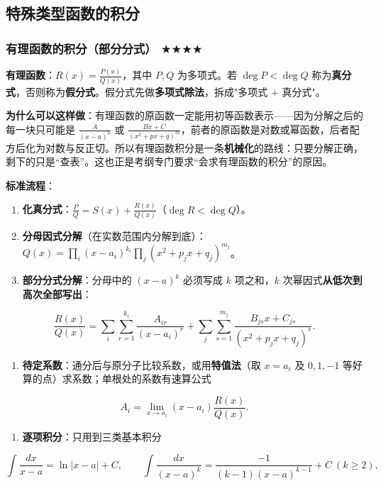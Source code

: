 \documentclass[11pt,openany,UTF8]{ctexbook}
\begin{document}
\subsection{特殊类型函数的积分}

\subsubsection{有理函数的积分（部分分式） $\bigstar$$\bigstar$$\bigstar$$\bigstar$}

\textbf{有理函数}：$R(x)=\frac{P(x)}{Q(x)}$，其中 $P,Q$ 为多项式。若 $\deg P<\deg Q$ 称为\textbf{真分式}，否则称为\textbf{假分式}。假分式先做\textbf{多项式除法}，拆成"多项式 $+$ 真分式"。

\textbf{为什么可以这样做}：有理函数的原函数一定能用初等函数表示——因为分解之后的每一块只可能是 $\frac{A}{(x-a)^k}$ 或 $\frac{Bx+C}{(x^2+px+q)^m}$，前者的原函数是对数或幂函数，后者配方后化为对数与反正切。所以有理函数积分是一条\textbf{机械化}的路线：只要分解正确，剩下的只是“查表”。这也正是考纲专门要求“会求有理函数的积分”的原因。

\textbf{标准流程}：

\begin{enumerate}
\item \textbf{化真分式}：$\frac{P}{Q}=S(x)+\frac{R(x)}{Q(x)}$（$\deg R<\deg Q$）。
\item \textbf{分母因式分解}（在实数范围内分解到底）：$Q(x)=\prod_i(x-a_i)^{k_i}\prod_j\left(x^2+p_jx+q_j\right)^{m_j}$。
\item \textbf{部分分式分解}：分母中的 $(x-a)^k$ 必须写成 $k$ 项之和，$k$ 次幂因式\textbf{从低次到高次全部写出}：
\end{enumerate}
\[\frac{R(x)}{Q(x)}=\sum_i\sum_{r=1}^{k_i}\frac{A_{ir}}{(x-a_i)^{r}}+\sum_j\sum_{s=1}^{m_j}\frac{B_{js}x+C_{js}}{\left(x^2+p_jx+q_j\right)^{s}}.\]

\begin{enumerate}
\item \textbf{待定系数}：通分后与原分子比较系数，或用\textbf{特值法}（取 $x=a_i$ 及 $0,1,-1$ 等好算的点）求系数；单根处的系数有速算公式
\end{enumerate}
\[A_i=\lim_{x\to a_i}(x-a_i)\frac{R(x)}{Q(x)}.\]

\begin{enumerate}
\item \textbf{逐项积分}：只用到三类基本积分
\end{enumerate}
\[\int\frac{dx}{x-a}=\ln\lvert x-a\rvert+C,\qquad \int\frac{dx}{(x-a)^k}=\frac{-1}{(k-1)(x-a)^{k-1}}+C\ (k\geq2),\]
\end{document}
